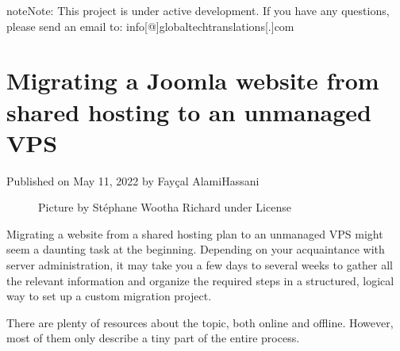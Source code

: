 \documentclass[a4paper,10pt,english,openany,oneside]{sphinxmanual}
\begin{document}
\begin{sphinxadmonition}{note}{Note:}
\sphinxAtStartPar
This project is under active development. If you have any questions, please send an email to: info{[}@{]}globaltech\sphinxhyphen{}translations{[}.{]}com \sphinxhyphen{} 
\end{sphinxadmonition}


\chapter{Migrating a Joomla website from shared hosting to an unmanaged VPS}
\label{\detokenize{joomla-to-vps:migrating-a-joomla-website-from-shared-hosting-to-an-unmanaged-vps}}\label{\detokenize{joomla-to-vps::doc}}
\sphinxAtStartPar
Published on May 11, 2022 by Fayçal Alami\sphinxhyphen{}Hassani %
\begin{footnote}[5]\sphinxAtStartFootnote
{}
%
\end{footnote}

\begin{figure}[H]
\centering
\capstart

\noindent{}
\caption{Picture by Stéphane Wootha Richard under \sphinxfootnotemark[6] License}\label{\detokenize{joomla-to-vps:id1}}\end{figure}
%
\begin{footnotetext}[6]\label{\thesphinxscope.6}%
\sphinxAtStartFootnote
{}
%
\end{footnotetext}\ignorespaces 
\sphinxAtStartPar
Migrating a website from a shared hosting plan to an unmanaged VPS might seem a daunting task at the beginning. Depending on your acquaintance with server administration, it may take you a few days to several weeks to gather all the relevant information and organize the required steps in a structured, logical way to set up a custom migration project.

\sphinxAtStartPar
There are plenty of resources about the topic, both online and offline. However, most of them only describe a tiny part of the entire process.
\end{document}
